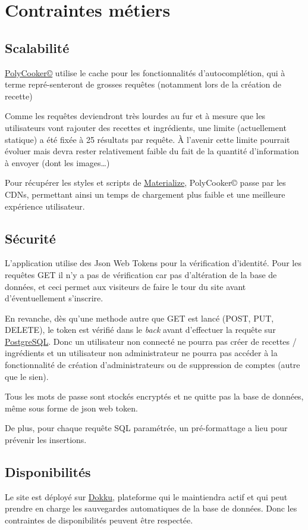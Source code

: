 \section{Contraintes métiers}
\subsection{Scalabilité}
\href{https://polycooker.cluster-ig3.igpolytech.fr/api}{PolyCooker©} utilise le cache pour les fonctionnalités d'autocomplétion, qui à terme repré-senteront de grosses requêtes (notamment lors de la création de recette)

\vspace{\baselineskip}
Comme les requêtes deviendront très lourdes au fur et à mesure que les utilisateurs vont rajouter des recettes et ingrédients, une limite (actuellement statique) a été fixée à 25 résultats par requête. À l'avenir cette limite pourrait évoluer mais devra rester relativement faible du fait de la quantité d'information à envoyer (dont les images\dots)

\vspace{\baselineskip}
Pour récupérer les styles et scripts de \href{https://materializecss.com/}{Materialize}, PolyCooker© passe par les CDNs, permettant ainsi un temps de chargement plus faible et une meilleure expérience utilisateur.


\subsection{Sécurité}
L'application utilise des Json Web Tokens pour la vérification d'identité. Pour les requêtes GET il n'y a pas de vérification car pas d'altération de la base de données, et ceci permet aux visiteurs de faire le tour du site avant d'éventuellement s'inscrire.

\vspace{\baselineskip}
En revanche, dès qu'une methode autre que GET est lancé (POST, PUT, DELETE), le token est vérifié dans le \textit{back} avant d'effectuer la requête sur \href{https://www.postgresql.org/}{PostgreSQL}. Donc un utilisateur non connecté ne pourra pas créer de recettes / ingrédients et un utilisateur non administrateur ne pourra pas accéder à la fonctionnalité de création d'administrateurs ou de suppression de comptes (autre que le sien).

\vspace{\baselineskip}
Tous les mots de passe sont stockés encryptés et ne quitte pas la base de données, même sous forme de json web token.

\vspace{\baselineskip}
De plus, pour chaque requête SQL paramétrée, un pré-formattage a lieu pour prévenir les insertions.

\subsection{Disponibilités}
Le site est déployé sur \href{https://dokku.com/}{Dokku}, plateforme qui le maintiendra actif et qui peut prendre en charge les sauvegardes automatiques de la base de données. Donc les contraintes de disponibilités peuvent être respectée.